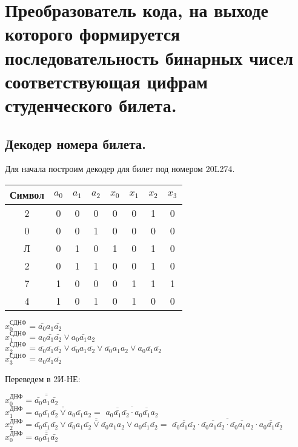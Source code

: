 \documentclass{bmstu}
\begin{document}
	\chapter{Преобразователь кода, на выходе которого формируется
			 последовательность бинарных чисел соответствующая цифрам
			 студенческого билета.}
	
		\section{Декодер номера билета.}
	\begin{flushleft}
		Для начала построим декодер для билет под номером 20L274.
	\end{flushleft}
	
	\begin{center}
		\begin{tabular}{ |c||c|c|c||c|c|c|c| } 
			\hline
			Символ & $a_0$ & $a_1$ & $a_2$ & $x_0$ & $x_1$ & $x_2$ & $x_3$ \\
			\hline
			2 & 0 & 0 & 0 & 0 & 0 & 1 & 0 \\
			0 & 0 & 0 & 1 & 0 & 0 & 0 & 0 \\ 
			Л & 0 & 1 & 0 & 1 & 0 & 1 & 0 \\ 
			2 & 0 & 1 & 1 & 0 & 0 & 1 & 0 \\ 
			7 & 1 & 0 & 0 & 0 & 1 & 1 & 1 \\ 
			4 & 1 & 0 & 1 & 0 & 1 & 0 & 0 \\  
			\hline
		\end{tabular}
	\end{center}
	
	$x_0^{\text{СДНФ}} = \bar{a_0} a_1 \bar{a_2}$ \\
	$x_1^{\text{СДНФ}} = a_0 \bar{a_1} \bar{a_2} \vee a_0 \bar{a_1} a_2$ \\
	$x_2^{\text{СДНФ}} = \bar{a_0} \bar{a_1} \bar{a_2} \vee \bar{a_0} a_1 \bar{a_2} \vee \bar{a_0} a_1 a_2 \vee a_0 \bar{a_1} \bar{a_2}$ \\
	$x_3^{\text{СДНФ}} = a_0 \bar{a_1} \bar{a_2}$ \\
	
	\begin{flushleft}
		Переведем в 2И-НЕ: 
	\end{flushleft}
	
	$x_0^{\text{ДНФ}} = \overline{\overline{\bar{a_0} a_1 \bar{a_2}}}$ \\
	$x_1^{\text{ДНФ}} = \overline{\overline{a_0 \bar{a_1} \bar{a_2} \vee a_0 \bar{a_1} a_2}} =$ $\overline{\overline{a_0 \bar{a_1} \bar{a_2}} \cdot \overline{a_0 \bar{a_1} a_2}}$ \\
	$x_2^{\text{ДНФ}} = \overline{\overline{\bar{a_0} \bar{a_1} \bar{a_2} \vee \bar{a_0} a_1 \bar{a_2} \vee \bar{a_0} a_1 a_2 \vee a_0 \bar{a_1} \bar{a_2}}} =$
	$\overline{\overline{\bar{a_0} \bar{a_1} \bar{a_2}} \cdot \overline{\bar{a_0} a_1 \bar{a_2}} \cdot \overline{\bar{a_0} a_1 a_2} \cdot \overline{a_0 \bar{a_1} \bar{a_2}}}$ \\
	$x_0^{\text{ДНФ}} = \overline{\overline{a_0 \bar{a_1} \bar{a_2}}}$ \\
	
\end{document}
